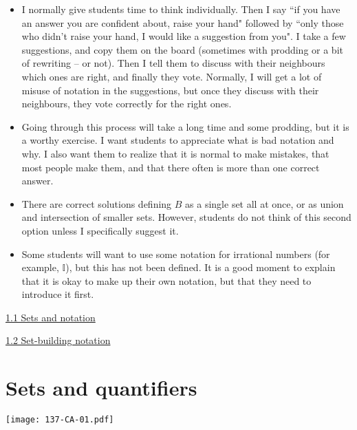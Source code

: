 \documentclass[11pt]{article}
\newcommand{\n}{\newpage}
\newcommand {\DS} [1] {${\displaystyle #1}$}
\newcommand{\nl}{\hfill \vspace{-1.1\baselineskip}} %
\newcommand{\vone}{\hspace{8mm} \href{https://www.youtube.com/watch?v=4ca1t9noMlo&list=PLlwePzQY_wW-CPzhk-af-MXj9knthD1gx&index=1}{1.1 Sets and notation}}
\newcommand{\vtwo}{\hspace{8mm} \href{https://www.youtube.com/watch?v=GQfOWN76eTA&list=PLlwePzQY_wW-CPzhk-af-MXj9knthD1gx&index=2}{1.2 Set-building notation}}
\begin{document}
\begin{comments}
\nl
\begin{itemize}
	\item  I normally give students time to think individually.   Then I say ``if you have an answer you are confident about, raise your hand"  followed by ``only those who didn't raise your hand, I would like a suggestion from you".  I take a few suggestions, and copy them on the board (sometimes with prodding or a bit of rewriting -- or not).  Then I tell them to discuss with their neighbours which ones are right, and finally they vote.   Normally, I will get a lot of misuse of notation in the suggestions, but once they discuss with their neighbours, they vote correctly for the right ones.     
	\item Going through this process will take a long time and some prodding, but it is a worthy exercise.  I want students to appreciate what is bad notation and why.  I also want them to realize that it is normal to make mistakes, that most people make them, and that there often is more than one correct answer.
	\item There are correct solutions defining $B$ as a single set all at once, or as union and intersection of smaller sets.  However, students do not think of this second option unless I specifically suggest it.
	\item Some students will want to use some notation for irrational numbers (for example, \DS{\mathbb{I}}), but this has not been defined.  It is a good moment to explain that it is okay to make up their own notation, but that they need to introduce it first.
\end{itemize}
\end{comments}

\begin{videos}
\vone

\vtwo

\end{videos}


\n
\newpage
\section{Sets and quantifiers} 

\begin{center}
{ \texttt{[image: 137-CA-01.pdf]}}
\end{center}
\end{document}
